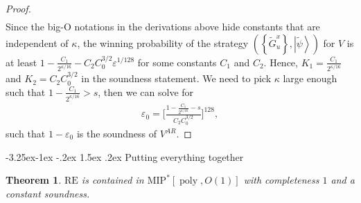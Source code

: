 \documentclass[10pt,a4paper]{article}
\makeatletter
\renewcommand{\subsection}{\@startsection{subsection}{2}{\z@}%
             {-3.25ex\@plus -1ex \@minus -.2ex}%
             {1.5ex \@plus .2ex}%
             {\normalfont\large\scshape\bfseries}}
\theoremstyle{plain}
\newtheorem{theorem}{Theorem}[section]
\theoremstyle{definition}
\newcommand {\set} [1] {\ensuremath{ \left\lbrace #1 \right\rbrace }}
\newcommand {\ket} [1] {\ensuremath{ \left| #1 \right\rangle }}
\newcommand{\poly} {\ensuremath{\operatorname{poly}}}
\newcommand{\ep} {\ensuremath{\varepsilon}}
\newcommand{\1}{\mathbb{1}} %
\newcommand{\tG}{\tilde{G}}
\newcommand{\tpsi}{\tilde{\psi}}
\newcommand{\MIP}{\mathrm{MIP}}
\newcommand{\RE}{\mathrm{RE}}
\makeatother
\begin{document}
\begin{proof}
\begin{align*}
\end{align*}
Since the big-O notations in the derivations above hide constants that are independent of $\kappa$, 
the winning probability of the strategy $(\set{ \tG^x_u }, \ket{\tpsi})$ for $V$ 
is at least $1 -\frac{C_1}{2^{\kappa/16}} - C_2C_0^{3/2}\ep^{1/128}$ for some constants $C_1$ and $C_2$.
Hence, $K_1 = \frac{C_1}{2^{\kappa/16}}$ and $K_2 = C_2C_0^{3/2}$ in the soundness statement.
We need to pick $\kappa$ large enough such that $1 -\frac{C_1}{2^{\kappa/16}} > s$, then we can solve for 
\begin{align*}
    \ep_0 = \Big[\frac{1 - \frac{C_1}{2^{\kappa/16}} - s}{ C_2 C_0^{3/2}}\Big]^{128},
\end{align*}
such that $1 - \ep_0$ is the soundness of $V^{AR}$.
\end{proof}

\subsection{Putting everything together}
\begin{theorem}
    \label{thm:re}
    $\RE$ is contained in $\MIP^\ast[\poly, O(1)]$ with completeness $1$ and a constant soundness. 
\end{theorem}
\end{document}
